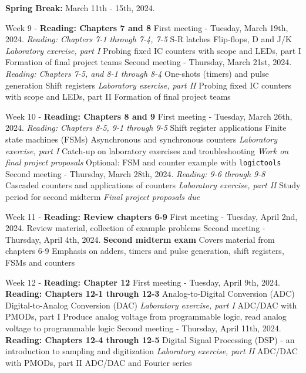 \documentclass[10pt]{article}
\begin{document}
\begin{outline}[enumerate]
\1 \textbf{Spring Break:} March 11th - 15th, 2024.

\1 Week 9 - \textbf{Reading: Chapters 7 and 8}
\2 First meeting - Tuesday, March 19th, 2024. \textit{Reading: Chapters 7-1 through 7-4, 7-5}
\3 S-R latches
\3 Flip-flops, D and J/K
\3 \textit{Laboratory exercise, part I}
\4 Probing fixed IC counters with scope and LEDs, part I
\4 Formation of final project teams
\2 Second meeting - Thursday, March 21st, 2024. \textit{Reading: Chapters 7-5, and 8-1 through 8-4}
\3 One-shots (timers) and pulse generation
\3 Shift registers
\3 \textit{Laboratory exercise, part II}
\4 Probing fixed IC counters with scope and LEDs, part II
\4 Formation of final project teams

\1 Week 10 - \textbf{Reading: Chapters 8 and 9}
\2 First meeting - Tuesday, March 26th, 2024. \textit{Reading: Chapters 8-5, 9-1 through 9-5}
\3 Shift register applications
\3 Finite state machines (FSMs)
\3 Asynchronous and synchronous counters
\3 \textit{Laboratory exercise, part I}
\4 Catch-up on laboratory exercises and troubleshooting
\4 \textit{Work on final project proposals}
\4 Optional: FSM and counter example with \verb+logictools+
\2 Second meeting - Thursday, March 28th, 2024. \textit{Reading: 9-6 through 9-8}
\3 Cascaded counters and applications of counters
\3 \textit{Laboratory exercise, part II}
\4 Study period for second midterm
\4 \textit{Final project proposals due}

\1 Week 11 - \textbf{Reading: Review chapters 6-9}
\2 First meeting - Tuesday, April 2nd, 2024.
\3 Review material, collection of example problems
\2 Second meeting - Thursday, April 4th, 2024.
\3 \textbf{Second midterm exam}
\4 Covers material from chapters 6-9
\4 Emphasis on adders, timers and pulse generation, shift registers, FSMs and counters

\1 Week 12 - \textbf{Reading: Chapter 12}
\2 First meeting - Tuesday, April 9th, 2024. \textbf{Reading: Chapters 12-1 through 12-3}
\3 Analog-to-Digital Conversion (ADC)
\3 Digital-to-Analog Conversion (DAC)
\3 \textit{Laboratory exercise, part I}
\4 ADC/DAC with PMODs, part I
\4 Produce analog voltage from programmable logic, read analog voltage to programmable logic
\2 Second meeting - Thursday, April 11th, 2024. \textbf{Reading: Chapters 12-4 through 12-5}
\3 Digital Signal Processing (DSP) - an introduction to sampling and digitization
\3 \textit{Laboratory exercise, part II}
\4 ADC/DAC with PMODs, part II
\4 ADC/DAC and Fourier series

\clearpage


\end{outline}
\end{document}
